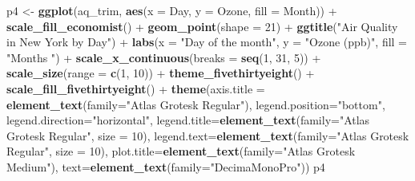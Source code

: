 \documentclass[]{article}
\newenvironment{Shaded}{\begin{snugshade}}{\end{snugshade}}
\newcommand{\KeywordTok}[1]{\textcolor[rgb]{0.13,0.29,0.53}{\textbf{{#1}}}}
\newcommand{\DataTypeTok}[1]{\textcolor[rgb]{0.13,0.29,0.53}{{#1}}}
\newcommand{\DecValTok}[1]{\textcolor[rgb]{0.00,0.00,0.81}{{#1}}}
\newcommand{\StringTok}[1]{\textcolor[rgb]{0.31,0.60,0.02}{{#1}}}
\newcommand{\NormalTok}[1]{{#1}}
\begin{document}
\begin{Shaded}
\begin{Highlighting}[]
\NormalTok{p4 <-}\StringTok{ }\KeywordTok{ggplot}\NormalTok{(aq_trim, }\KeywordTok{aes}\NormalTok{(}\DataTypeTok{x =} \NormalTok{Day, }\DataTypeTok{y =} \NormalTok{Ozone, }\DataTypeTok{fill =} \NormalTok{Month)) +}
\StringTok{  }\KeywordTok{scale_fill_economist}\NormalTok{() +}
\StringTok{  }\KeywordTok{geom_point}\NormalTok{(}\DataTypeTok{shape =} \DecValTok{21}\NormalTok{) +}
\StringTok{  }\KeywordTok{ggtitle}\NormalTok{(}\StringTok{"Air Quality in New York by Day"}\NormalTok{) +}\StringTok{ }
\StringTok{  }\KeywordTok{labs}\NormalTok{(}\DataTypeTok{x =} \StringTok{"Day of the month"}\NormalTok{, }\DataTypeTok{y =} \StringTok{"Ozone (ppb)"}\NormalTok{, }\DataTypeTok{fill =} \StringTok{"Months "}\NormalTok{) +}
\StringTok{  }\KeywordTok{scale_x_continuous}\NormalTok{(}\DataTypeTok{breaks =} \KeywordTok{seq}\NormalTok{(}\DecValTok{1}\NormalTok{, }\DecValTok{31}\NormalTok{, }\DecValTok{5}\NormalTok{)) +}
\StringTok{  }\KeywordTok{scale_size}\NormalTok{(}\DataTypeTok{range =} \KeywordTok{c}\NormalTok{(}\DecValTok{1}\NormalTok{, }\DecValTok{10}\NormalTok{)) +}
\StringTok{  }\KeywordTok{theme_fivethirtyeight}\NormalTok{() +}\StringTok{ }\KeywordTok{scale_fill_fivethirtyeight}\NormalTok{() +}\StringTok{   }
\StringTok{  }\KeywordTok{theme}\NormalTok{(}\DataTypeTok{axis.title =} \KeywordTok{element_text}\NormalTok{(}\DataTypeTok{family=}\StringTok{"Atlas Grotesk Regular"}\NormalTok{),}
    \DataTypeTok{legend.position=}\StringTok{"bottom"}\NormalTok{, }
    \DataTypeTok{legend.direction=}\StringTok{"horizontal"}\NormalTok{, }
    \DataTypeTok{legend.title=}\KeywordTok{element_text}\NormalTok{(}\DataTypeTok{family=}\StringTok{"Atlas Grotesk Regular"}\NormalTok{, }\DataTypeTok{size =} \DecValTok{10}\NormalTok{),}
    \DataTypeTok{legend.text=}\KeywordTok{element_text}\NormalTok{(}\DataTypeTok{family=}\StringTok{"Atlas Grotesk Regular"}\NormalTok{, }\DataTypeTok{size =} \DecValTok{10}\NormalTok{),}
    \DataTypeTok{plot.title=}\KeywordTok{element_text}\NormalTok{(}\DataTypeTok{family=}\StringTok{"Atlas Grotesk Medium"}\NormalTok{), }
    \DataTypeTok{text=}\KeywordTok{element_text}\NormalTok{(}\DataTypeTok{family=}\StringTok{"DecimaMonoPro"}\NormalTok{)) }
\NormalTok{p4}
\end{Highlighting}
\end{Shaded}
\end{document}
